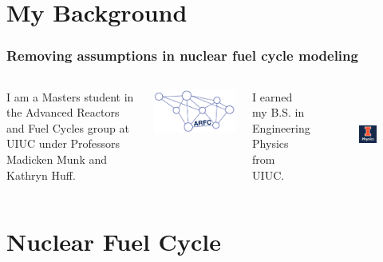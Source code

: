 \documentclass[9pt]{beamer}
\begin{document}
\section{My Background}
  \begin{frame}
    \frametitle{Removing assumptions in nuclear fuel cycle modeling}
    \begin{columns}
      \column[t]{5cm}
      I am a Masters student in the Advanced Reactors and Fuel Cycles group at
      UIUC under Professors Madicken Munk and Kathryn Huff.
      \begin{center}
              \includegraphics[height=0.2\textheight]{./images/arfc-logo}
      \end{center}

      \column[t]{5cm}
      I earned my B.S. in Engineering Physics from UIUC.
      \begin{figure}[htbp!]
        \begin{center}
          \includegraphics[height=3cm]{./images/ill_phys.png}
        \end{center}
        \label{fig:uiuc_phys}
      \end{figure}
    \end{columns}
  \end{frame}


\section{Nuclear Fuel Cycle}
\end{document}
